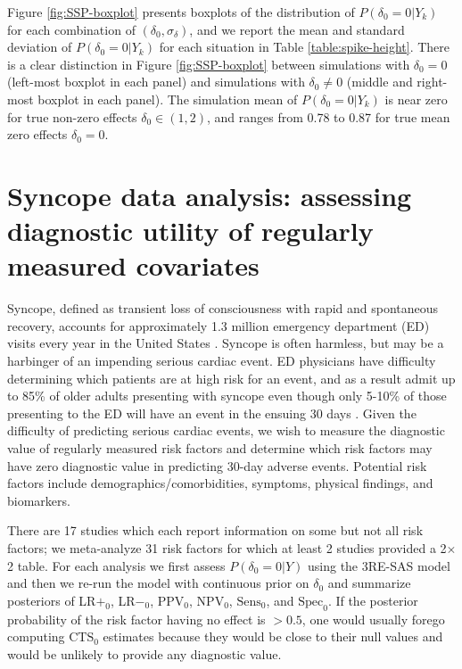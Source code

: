 \documentclass[AMA,STIX1COL]{WileyNJD-v2}
\newcommand{\CTSo}{\text{CTS}_0}
\begin{document}
Figure \ref{fig:SSP-boxplot} presents boxplots of the distribution of $P(\delta_0 = 0 \vert Y_k)$ for each combination of $(\delta_0, \sigma_\delta)$, and we report the mean and standard deviation of $P(\delta_0 = 0 \vert Y_k)$ for each situation in Table \ref{table:spike-height}. There is a clear distinction in Figure \ref{fig:SSP-boxplot} between simulations with $\delta_0 = 0$ (left-most boxplot in each panel) and simulations with $\delta_0 \ne 0$ (middle and right-most boxplot in each panel). The simulation mean of $P(\delta_0 = 0 \vert Y_k)$ is near zero for true non-zero effects $\delta_0 \in (1, 2)$, and ranges from 0.78 to 0.87 for true mean zero effects $\delta_0 = 0$.

\section{Syncope data analysis: assessing diagnostic utility of regularly measured covariates} \label{sec:syncope}

Syncope, defined as transient loss of consciousness with rapid and spontaneous recovery, accounts for approximately 1.3 million emergency department (ED) visits every year in the United States \cite{probst2015admissions}. Syncope is often harmless, but may be a harbinger of an impending serious cardiac event. ED physicians have difficulty determining which patients are at high risk for an event, and as a result admit up to 85\% of older adults presenting with syncope \cite{birnbaum2008failure} even though only 5-10\% of those presenting to the ED will have an event in the ensuing 30 days \cite{gibson2018}. Given the difficulty of predicting serious cardiac events, we wish to measure the diagnostic value of regularly measured risk factors and determine which risk factors may have zero diagnostic value in predicting 30-day adverse events. Potential risk factors include demographics/comorbidities, symptoms, physical findings, and biomarkers. 

There are 17 studies which each report information on some but not all risk factors; we meta-analyze 31 risk factors for which at least 2 studies provided a 2$\times$2 table. For each analysis we first assess $P(\delta_0 = 0 \vert Y)$ using the 3RE-SAS model and then we re-run the model with continuous prior on $\delta_0$ and summarize posteriors of LR$+_0$, LR$-_0$, $\mbox{PPV}_0$, $\mbox{NPV}_0$, $\mbox{Sens}_0$, and $\mbox{Spec}_0$. If the posterior probability of the risk factor having no effect is $ > 0.5$, one would usually forego computing $\CTSo$ estimates because they would be close to their null values and would be unlikely to provide any diagnostic value. 
\end{document}
